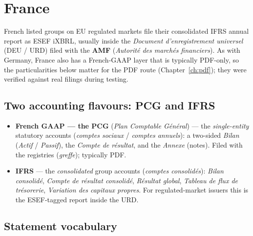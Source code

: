 \documentclass[11pt,a4paper]{report}
\begin{document}
\section{France}
\label{sec:esef-france}

French listed groups on EU regulated markets file their consolidated IFRS annual report as ESEF iXBRL,
usually inside the \emph{Document d'enregistrement universel} (DEU / URD) filed with the \textbf{AMF}
(\emph{Autorité des marchés financiers}). As with Germany, France also has a French-GAAP layer that is
typically PDF-only, so the particularities below matter for the PDF route (Chapter~\ref{ch:pdf}); they were
verified against real filings during testing.

\subsection{Two accounting flavours: PCG and IFRS}

\begin{itemize}
  \item \textbf{French GAAP --- the PCG} (\emph{Plan Comptable Général}) --- the \emph{single-entity}
    statutory accounts (\emph{comptes sociaux} / \emph{comptes annuels}): a two-sided \emph{Bilan}
    (\emph{Actif} / \emph{Passif}), the \emph{Compte de résultat}, and the \emph{Annexe} (notes). Filed
    with the registries (\emph{greffe}); typically PDF.
  \item \textbf{IFRS} --- the \emph{consolidated} group accounts (\emph{comptes consolidés}): \emph{Bilan
    consolidé}, \emph{Compte de résultat consolidé}, \emph{Résultat global}, \emph{Tableau de flux de
    trésorerie}, \emph{Variation des capitaux propres}. For regulated-market issuers this is the
    ESEF-tagged report inside the URD.
\end{itemize}

\subsection{Statement vocabulary}
\end{document}
